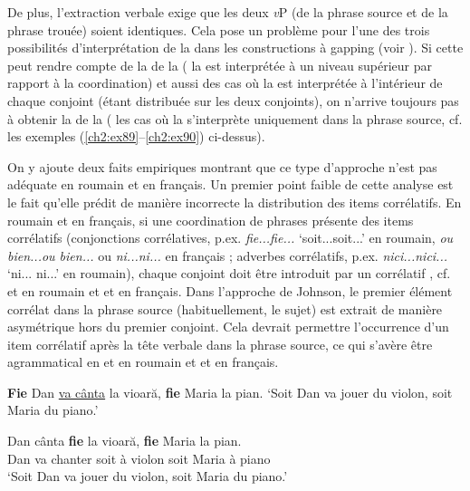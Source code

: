 De plus, l’extraction verbale exige que les deux \textit{v}P (de la phrase source et de la phrase trouée) soient identiques. Cela pose un problème pour l’une des trois possibilités d’interprétation de la  dans les constructions à gapping (voir \citealt{Repp2009}). Si cette  peut rendre compte de la  de la  ({\cad} la  est interprétée à un niveau supérieur par rapport à la coordination) et aussi des cas où la  est interprétée à l’intérieur de chaque conjoint (étant distribuée sur les deux conjoints), on n’arrive toujours pas à obtenir la  de la  ({\cad} les cas où la  s’interprète uniquement dans la phrase source, cf. les exemples (\ref{ch2:ex89}--\ref{ch2:ex90}) ci-dessus). 

On y ajoute deux faits empiriques montrant que ce type d’approche n’est pas adéquate en roumain et en français. Un premier point faible de cette analyse est le fait qu’elle prédit de manière incorrecte la distribution des items corrélatifs. En roumain et en français, si une coordination de phrases présente des items corrélatifs (conjonctions corrélatives, p.ex. \textit{fie...fie...} ‘soit...soit...’ en roumain, \textit{ou bien...ou bien...} ou \textit{ni...ni...} en français ; adverbes corrélatifs, p.ex. \textit{nici...nici...} ‘ni... ni...’ en roumain), chaque conjoint doit être introduit par un corrélatif \citep{Bilbiie2008,Mouret2007}, cf.  et  en roumain et  et  en français. Dans l’approche de Johnson, le premier élément corrélat dans la phrase source (habituellement, le sujet) est extrait de manière asymétrique hors du premier conjoint. Cela devrait permettre l’occurrence d’un item corrélatif après la tête verbale dans la phrase source, ce qui s’avère être agrammatical en  et  en roumain et  et  en français.  

\ea
\ea \textbf{Fie} Dan \uline{va cânta} la vioară, \textbf{fie} Maria la pian. \label{ch2:ex227a}
\glt ‘Soit Dan va jouer du violon, soit Maria du piano.’   

\ex 
\gll *Dan    cânta  \textbf{fie} la  vioară,  \textbf{fie}  Maria  la  pian. \label{ch2:ex227b}\\
Dan  va  chanter  soit  à  violon  soit  Maria  à  piano\\
\glt ‘Soit Dan va jouer du violon, soit Maria du piano.’
\z
\z


